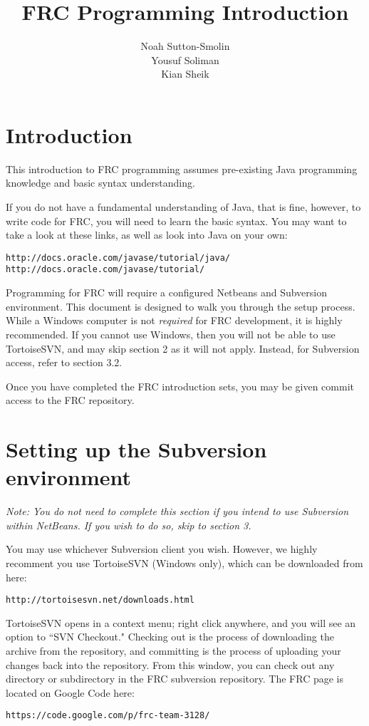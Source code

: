 \documentclass[a4paper]{article}
\title{FRC Programming Introduction}
\author{Noah Sutton-Smolin\\Yousuf Soliman\\Kian Sheik}
\begin{document}
\maketitle

\section{Introduction}

This introduction to FRC programming assumes pre-existing Java programming knowledge and basic syntax understanding.

If you do not have a fundamental understanding of Java, that is fine, however, to write code for FRC, you will need to learn the basic syntax. You may want to take a look at these links, as well as look into Java on your own:

\begin{verbatim}http://docs.oracle.com/javase/tutorial/java/
http://docs.oracle.com/javase/tutorial/\end{verbatim}

Programming for FRC will require a configured Netbeans and Subversion environment. This document is designed to walk you through the setup process. While a Windows computer is not \textit{required} for FRC development, it is highly recommended. If you cannot use Windows, then you will not be able to use TortoiseSVN, and may skip section 2 as it will not apply. Instead, for Subversion access, refer to section 3.2.

Once you have completed the FRC introduction sets, you may be given commit access to the FRC repository.

\section{Setting up the Subversion environment}

\textit{Note: You do not need to complete this section if you intend to use Subversion within NetBeans. If you wish to do so, skip to section 3.}\newline

You may use whichever Subversion client you wish. However, we highly recomment you use TortoiseSVN (Windows only), which can be downloaded from here: \begin{verbatim}http://tortoisesvn.net/downloads.html\end{verbatim}

TortoiseSVN opens in a context menu; right click anywhere, and you will see an option to ``SVN Checkout." Checking out is the process of downloading the archive from the repository, and committing is the process of uploading your changes back into the repository. From this window, you can check out any directory or subdirectory in the FRC subversion repository. The FRC page is located on Google Code here:\begin{verbatim}https://code.google.com/p/frc-team-3128/\end{verbatim}
\end{document}
